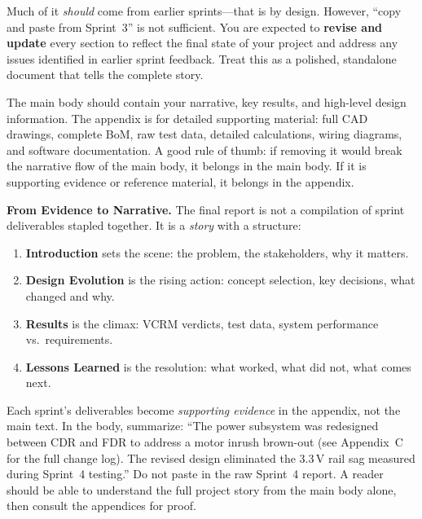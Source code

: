 \documentclass[11pt,letterpaper]{article}
\begin{document}
\begin{faqbox}
Much of it \textit{should} come from earlier sprints---that is by design. However, ``copy and paste from Sprint~3'' is not sufficient. You are expected to \textbf{revise and update} every section to reflect the final state of your project and address any issues identified in earlier sprint feedback. Treat this as a polished, standalone document that tells the complete story.
\end{faqbox}

\begin{faqbox}
The main body should contain your narrative, key results, and high-level design information. The appendix is for detailed supporting material: full CAD drawings, complete BoM, raw test data, detailed calculations, wiring diagrams, and software documentation. A good rule of thumb: if removing it would break the narrative flow of the main body, it belongs in the main body. If it is supporting evidence or reference material, it belongs in the appendix.
\end{faqbox}

\begin{protip}
\textbf{From Evidence to Narrative.} The final report is not a compilation of sprint deliverables stapled together. It is a \textit{story} with a structure:

\begin{enumerate}[leftmargin=*, itemsep=1pt, topsep=0pt]
    \item \textbf{Introduction} sets the scene: the problem, the stakeholders, why it matters.
    \item \textbf{Design Evolution} is the rising action: concept selection, key decisions, what changed and why.
    \item \textbf{Results} is the climax: VCRM verdicts, test data, system performance vs.\ requirements.
    \item \textbf{Lessons Learned} is the resolution: what worked, what did not, what comes next.
\end{enumerate}

Each sprint's deliverables become \textit{supporting evidence} in the appendix, not the main text. In the body, summarize: ``The power subsystem was redesigned between CDR and FDR to address a motor inrush brown-out (see Appendix~C for the full change log). The revised design eliminated the 3.3\,V rail sag measured during Sprint~4 testing.'' Do not paste in the raw Sprint~4 report. A reader should be able to understand the full project story from the main body alone, then consult the appendices for proof.
\end{protip}
\end{document}
